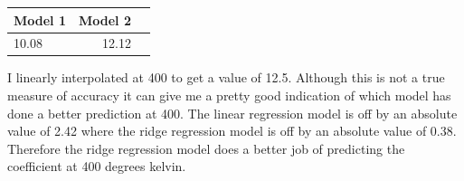 \documentclass[a4paper]{article}
\begin{document}
\begin{enumerate}
\begin{tabular}{lrr}
\toprule
Model 1 &  Model 2 \\
\midrule
10.08 &    12.12 \\
\bottomrule
\end{tabular}

I linearly interpolated at 400 to get a value of 12.5.  Although this is not a true measure of accuracy it can give me a pretty good indication of which model has done a better prediction at 400.  The linear regression model is off by an absolute value of 2.42 where the ridge regression model is off by an absolute value of 0.38.  Therefore the ridge regression model does a better job of predicting the coefficient at 400 degrees kelvin.

\end{enumerate}
\end{document}
